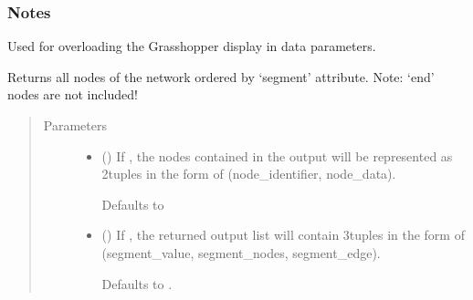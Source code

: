 \documentclass[letterpaper,10pt,english]{sphinxmanual}
\begin{document}
\begin{fulllineitems}
\begin{fulllineitems}
\begin{quote}
\begin{description}
\end{description}\end{quote}
\subsubsection*{Notes}

Used for overloading the Grasshopper display in data parameters.

\end{fulllineitems}


\begin{fulllineitems}
\label{\detokenize{cockatoo:cockatoo.KnitNetwork.all_nodes_by_segment}}
Returns all nodes of the network ordered by ‘segment’ attribute.
Note: ‘end’ nodes are not included!
\begin{quote}\begin{description}
\item[{Parameters}] \leavevmode\begin{itemize}
\item {} 
 (\sphinxstyleliteralemphasis{\sphinxupquote{, }}) \textendash{} 
If , the nodes contained in the output will be represented
as 2\sphinxhyphen{}tuples in the form of (node\_identifier, node\_data).

Defaults to 


\item {} 
 (\sphinxstyleliteralemphasis{\sphinxupquote{, }}) \textendash{} 
If , the returned output list will contain 3\sphinxhyphen{}tuples in the
form of (segment\_value, segment\_nodes, segment\_edge).

Defaults to .



\end{itemize}
\end{description}
\end{quote}
\end{fulllineitems}
\end{fulllineitems}
\end{document}

